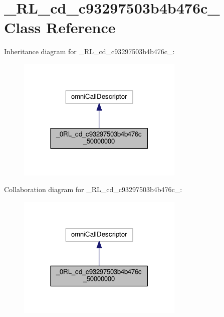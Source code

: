 \hypertarget{class__0_r_l__cd__c93297503b4b476c__50000000}{}\section{\+\_\+R\+L\+\_\+cd\+\_\+c93297503b4b476c\+\_ Class Reference}
\label{class__0_r_l__cd__c93297503b4b476c__50000000}


Inheritance diagram for \+\_\+R\+L\+\_\+cd\+\_\+c93297503b4b476c\+\_\+:
\nopagebreak
\begin{figure}[H]
\begin{center}
\leavevmode
\includegraphics[width=225pt]{class__0_r_l__cd__c93297503b4b476c__50000000__inherit__graph}
\end{center}
\end{figure}


Collaboration diagram for \+\_\+R\+L\+\_\+cd\+\_\+c93297503b4b476c\+\_\+:
\nopagebreak
\begin{figure}[H]
\begin{center}
\leavevmode
\includegraphics[width=225pt]{class__0_r_l__cd__c93297503b4b476c__50000000__coll__graph}
\end{center}
\end{figure}
